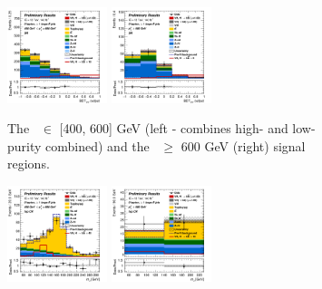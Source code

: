 \begin{figure}[h!]
    \centering
    \begin{subfigure}[b]{\textwidth}
        \centering
        \includegraphics[width=0.32\textwidth]{Images/VH/Own_fit/postfit_VHbb/Region_distmva_BMax600_BMin400_incFat1_Fat1_DSRnoaddbjetsr_J0_TTypebb_incJet1_T2_L0_Y6051_GlobalFit_conditionnal_mu1.png}
        \includegraphics[width=0.32\textwidth]{Images/VH/Own_fit/postfit_VHbb/Region_distmva_BMin600_incFat1_Fat1_DSRnoaddbjetsr_J0_TTypebb_incJet1_T2_L0_Y6051_GlobalFit_conditionnal_mu1.png}
        \caption{The \ptv\ $\in$ [400, 600] GeV (left - combines high- and low-purity combined) and the \ptv\ $\geq$ 600 GeV (right) signal regions.}
        \label{fig:plots_VHbbBoost_OL_SR}
    \end{subfigure}
    \begin{subfigure}[b]{\textwidth}
        \centering
        \includegraphics[width=0.32\textwidth]{Images/VH/Own_fit/postfit_VHbb/Region_distmBB_BMax600_BMin400_incFat1_Fat1_DSRtopaddbjetcr_J0_TTypebb_incJet1_T2_L0_Y6051_GlobalFit_conditionnal_mu1.png}
        \includegraphics[width=0.32\textwidth]{Images/VH/Own_fit/postfit_VHbb/Region_distmBB_BMin600_incFat1_Fat1_DSRtopaddbjetcr_J0_TTypebb_incJet1_T2_L0_Y6051_GlobalFit_conditionnal_mu1.png}

\end{subfigure}
\end{figure}
